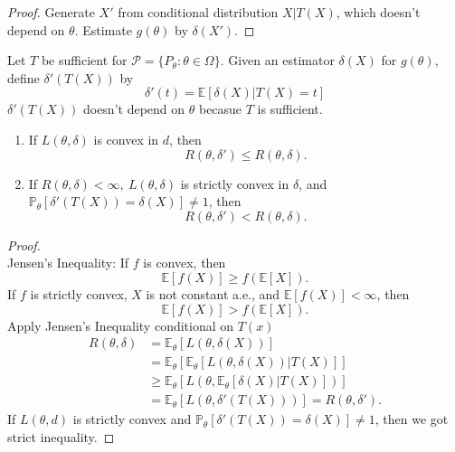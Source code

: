 \documentclass[a4paper]{article}
\begin{document}
\begin{proof}
	Generate $X'$ from conditional distribution $X|T(X)$, which doesn't depend on $\theta$. Estimate $g(\theta)$ by $\delta(X')$.
\end{proof}

\begin{thm}
	Let $T$ be sufficient for $\mathcal{P}=\{P_\theta: \theta \in \Omega \}$. Given an estimator $\delta(X)$ for $g(\theta)$, define $\delta'(T(X))$ by
	\begin{equation}
		\delta'(t)=\mathbb{E}[\delta(X)|T(X)=t]
	\end{equation}
	$\delta'(T(X))$ doesn't depend on $\theta$ becasue $T$ is sufficient.
	\begin{enumerate}
		\item If $L(\theta,\delta)$ is convex in $d$, then
			  \begin{equation}
			  	R(\theta,\delta') \leq R(\theta,\delta).
			  \end{equation}
		\item If $R(\theta,\delta) < \infty, \ L(\theta,\delta)$ is strictly convex in $\delta$, and $\mathbb{P}_\theta[\delta'(T(X))=\delta(X)]\neq1$, then
			  \begin{equation}
			  	R(\theta,\delta') < R(\theta,\delta).
			  \end{equation}
	\end{enumerate}
\end{thm}

\begin{proof}
	\quad \\
	Jensen's Inequality: If $f$ is convex, then
	\begin{equation*}
		\mathbb{E}[f(X)] \geq f(\mathbb{E}[X]).
	\end{equation*}
	If $f$ is strictly convex, $X$ is not constant a.e., and $\mathbb{E}[f(X)] < \infty$, then
	\begin{equation*}
		\mathbb{E}[f(X)] > f(\mathbb{E}[X]).
	\end{equation*}
    Apply Jensen's Inequality conditional on $T(x)$
	\begin{equation}
		\begin{aligned}
			R(\theta,\delta) &= \mathbb{E}_\theta[L(\theta,\delta(X))] \\
			&= \mathbb{E}_\theta[\mathbb{E}_\theta[L(\theta,\delta(X))|T(X)]] \\
			&\geq \mathbb{E}_\theta[L(\theta,\mathbb{E}_\theta[\delta(X)|T(X)])] \\
			&= \mathbb{E}_\theta[L(\theta,\delta'(T(X)))] = R(\theta,\delta').
		\end{aligned}
	\end{equation}
	If $L(\theta,d)$ is strictly convex and $\mathbb{P}_\theta[\delta'(T(X))=\delta(X)]\neq1$, then we got strict inequality.
\end{proof}
\end{document}
